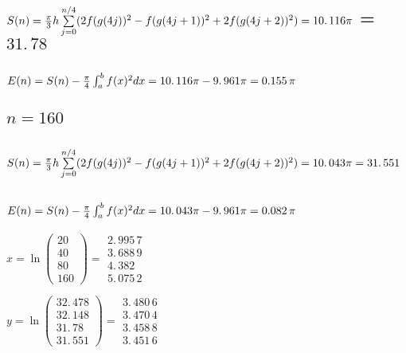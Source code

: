 \documentclass{article}
\begin{document}
\subsection{$S(n)=\frac{\protect\pi }{3}h\sum%
\limits_{j=0}^{n/4}(2f(g(4j))^{2}-f(g(4j+1))^{2}+2f(g(4j+2))^{2})=%
\allowbreak 10.\,\allowbreak 116\protect\pi $ = $31.\,\allowbreak 78$}

\subsection{$E(n)=S(n)-\frac{\protect\pi }{4}\protect\int_{a}^{b}f(x)^{2}dx=%
\allowbreak \allowbreak 10.\,\allowbreak 116\protect\pi -\allowbreak
9.\,\allowbreak 961\protect\pi =\allowbreak 0.155\,\protect\pi $}

\bigskip

\subsection{$n=160$}

\subsection{$S(n)=\frac{\protect\pi }{3}h\sum%
\limits_{j=0}^{n/4}(2f(g(4j))^{2}-f(g(4j+1))^{2}+2f(g(4j+2))^{2})=%
\allowbreak 10.\,\allowbreak 043\protect\pi =\allowbreak 31.\,\allowbreak 551
$}

\subsection{$E(n)=S(n)-\frac{\protect\pi }{4}\protect\int_{a}^{b}f(x)^{2}dx=%
\allowbreak \allowbreak \allowbreak 10.\,\allowbreak 043\protect\pi %
-\allowbreak 9.\,\allowbreak 961\protect\pi =\allowbreak 0.082\,\protect\pi $%
}

\bigskip $x=\ln (%
\begin{array}{c}
20 \\ 
40 \\ 
80 \\ 
160%
\end{array}%
)=\allowbreak 
\begin{array}{c}
2.\,\allowbreak 995\,7 \\ 
3.\,\allowbreak 688\,9 \\ 
4.\,\allowbreak 382 \\ 
5.\,\allowbreak 075\,2%
\end{array}%
\allowbreak $

$y=\ln (%
\begin{array}{c}
32.\,\allowbreak 478 \\ 
\allowbreak 32.\,\allowbreak 148 \\ 
31.\,\allowbreak 78 \\ 
\allowbreak 31.\,\allowbreak 551%
\end{array}%
)=\allowbreak 
\begin{array}{c}
3.\,\allowbreak 480\,6 \\ 
3.\,\allowbreak 470\,4 \\ 
3.\,\allowbreak 458\,8 \\ 
3.\,\allowbreak 451\,6%
\end{array}%
\allowbreak $
\end{document}
